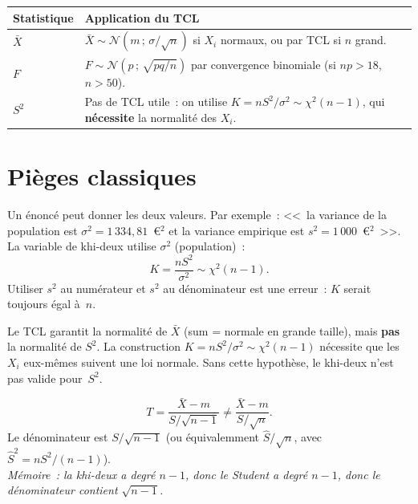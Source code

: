 \documentclass[11pt,a4paper]{article}
\newcommand{\N}{\mathcal{N}}
\begin{document}
\begin{methbox}
\renewcommand{\arraystretch}{1.5}
\begin{tabularx}{\linewidth}{lX}
\toprule
\textbf{Statistique} & \textbf{Application du TCL} \\
\midrule
$\bar{X}$ & $\bar{X}\sim\N(m\,;\,\sigma/\sqrt{n})$ si $X_i$ normaux, ou par TCL si $n$ grand. \\
$F$ & $F\sim\N(p\,;\,\sqrt{pq/n})$ par convergence binomiale (si $np>18$, $n>50$). \\
$S^2$ & Pas de TCL utile~: on utilise $K=nS^2/\sigma^2\sim\chi^2(n-1)$, qui \textbf{n\'ecessite} la normalit\'e des $X_i$. \\
\bottomrule
\end{tabularx}
\end{methbox}

\newpage
\section{Pi\`eges classiques}

\begin{alertbox}
Un \'enonc\'e peut donner les deux valeurs. Par exemple~: <<~la variance de la population est $\sigma^2=1\,334{,}81$~\euro$^2$ et la variance empirique est $s^2=1\,000$~\euro$^2$~>>. La variable de khi-deux utilise $\sigma^2$ (population)~:
$$K = \frac{nS^2}{\sigma^2} \sim \chi^2(n-1).$$
Utiliser $s^2$ au num\'erateur et $s^2$ au d\'enominateur est une erreur~: $K$ serait toujours \'egal \`a~$n$.
\end{alertbox}

\begin{alertbox}
Le TCL garantit la normalit\'e de $\bar{X}$ (sum = normale en grande taille), mais \textbf{pas} la normalit\'e de $S^2$. La construction $K=nS^2/\sigma^2\sim\chi^2(n-1)$ n\'ecessite que les $X_i$ eux-m\^emes suivent une loi normale. Sans cette hypoth\`ese, le khi-deux n'est pas valide pour~$S^2$.
\end{alertbox}

\begin{alertbox}
$$T = \frac{\bar{X}-m}{S/\sqrt{n-1}} \neq \frac{\bar{X}-m}{S/\sqrt{n}}.$$
Le d\'enominateur est $S/\sqrt{n-1}$ (ou \'equivalemment $\hat{S}/\sqrt{n}$, avec $\hat{S}^2=nS^2/(n-1)$).\\
\textit{M\'emoire~: la khi-deux a degr\'e $n-1$, donc le Student a degr\'e $n-1$, donc le d\'enominateur contient $\sqrt{n-1}$.}
\end{alertbox}
\end{document}

